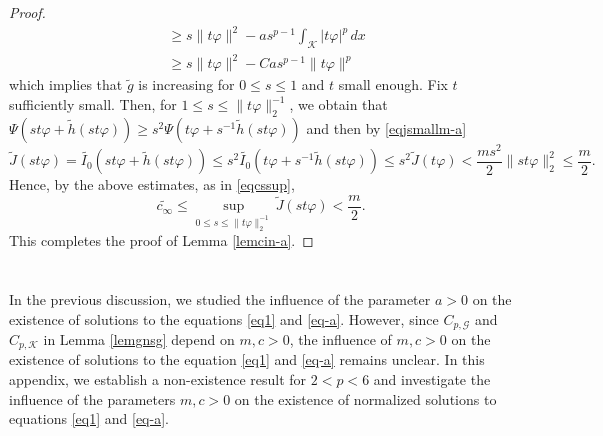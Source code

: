 \documentclass[11pt]{amsart}
\newcommand{\abs}[1]{\lvert#1\rvert}
\newcommand{\norm}[1]{\lVert#1\rVert}
\newcommand{\G}{\mathcal{G}}
\newcommand{\K}{\mathcal{K}}
\numberwithin{equation}{section}
\begin{document}
\begin{proof}
$$\begin{aligned}
& \geq s\norm{t\varphi}^2-as^{p-1}\int_{\K} \abs{t\varphi}^{p} \,dx \\
& \geq s\norm{t\varphi}^2-Cas^{p-1}\norm{t\varphi}^{p}
\end{aligned}
$$
which implies that $\widetilde{g}$ is increasing for $0 \leq s \leq 1$ and $t$ small enough. Fix $t$ sufficiently small. Then, for $1 \leq s \leq \norm{t\varphi}_{2}^{-1}$, we obtain that $\Psi(st\varphi+\widetilde{h}(st\varphi)) \geq s^{2} \Psi(t\varphi+s^{-1} \widetilde{h}(st\varphi))$ and then by \eqref{eqjsmallm-a}
$$
\widetilde{J}(st\varphi)=\widetilde{I_{0}}(st\varphi+\widetilde{h}(st\varphi)) \leq s^{2} \widetilde{I_{0}}(t\varphi+s^{-1} \widetilde{h}(st\varphi)) \leq s^{2} \widetilde{J}(t\varphi)<\frac{m s^{2}}{2}\norm{st\varphi}_{2}^{2} \leq \frac{m}{2}.
$$
Hence, by the above estimates, as in \eqref{eqcssup},
$$
\widetilde{c_{\infty}} \leq \sup _{0 \leq s \leq\norm{t\varphi}_{2} ^{-1}} \widetilde{J}(st\varphi)<\frac{m}{2}.
$$ This completes the proof of Lemma \ref{lemcin-a}.
\end{proof}
\appendix \section{}\label{appa}
In the previous discussion, we studied the influence of the parameter $a>0$ on the existence of solutions to the equations \eqref{eq1} and \eqref{eq-a}. However, since $C_{p,\G}$ and $C_{p,\K}$ in Lemma \ref{lemgnsg} depend on $m,c >0$, the influence of $m,c >0$ on the existence of solutions to the equation \eqref{eq1} and \eqref{eq-a} remains unclear. In this appendix, we establish a non-existence result for $2<p<6$ and  investigate the influence of the parameters $m, c>0$ on the existence of normalized solutions to equations \eqref{eq1} and \eqref{eq-a}.
\end{document}
